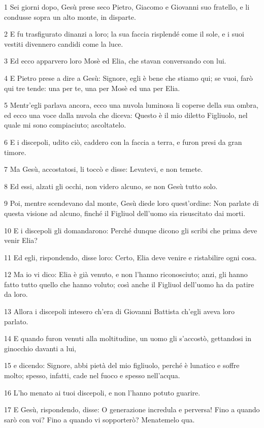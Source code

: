 \par 1 Sei giorni dopo, Gesù prese seco Pietro, Giacomo e Giovanni suo fratello, e li condusse sopra un alto monte, in disparte.
\par 2 E fu trasfigurato dinanzi a loro; la sua faccia risplendé come il sole, e i suoi vestiti divennero candidi come la luce.
\par 3 Ed ecco apparvero loro Mosè ed Elia, che stavan conversando con lui.
\par 4 E Pietro prese a dire a Gesù: Signore, egli è bene che stiamo qui; se vuoi, farò qui tre tende: una per te, una per Mosè ed una per Elia.
\par 5 Mentr'egli parlava ancora, ecco una nuvola luminosa li coperse della sua ombra, ed ecco una voce dalla nuvola che diceva: Questo è il mio diletto Figliuolo, nel quale mi sono compiaciuto; ascoltatelo.
\par 6 E i discepoli, udito ciò, caddero con la faccia a terra, e furon presi da gran timore.
\par 7 Ma Gesù, accostatosi, li toccò e disse: Levatevi, e non temete.
\par 8 Ed essi, alzati gli occhi, non videro alcuno, se non Gesù tutto solo.
\par 9 Poi, mentre scendevano dal monte, Gesù diede loro quest'ordine: Non parlate di questa visione ad alcuno, finché il Figliuol dell'uomo sia risuscitato dai morti.
\par 10 E i discepoli gli domandarono: Perché dunque dicono gli scribi che prima deve venir Elia?
\par 11 Ed egli, rispondendo, disse loro: Certo, Elia deve venire e ristabilire ogni cosa.
\par 12 Ma io vi dico: Elia è già venuto, e non l'hanno riconosciuto; anzi, gli hanno fatto tutto quello che hanno voluto; così anche il Figliuol dell'uomo ha da patire da loro.
\par 13 Allora i discepoli intesero ch'era di Giovanni Battista ch'egli aveva loro parlato.
\par 14 E quando furon venuti alla moltitudine, un uomo gli s'accostò, gettandosi in ginocchio davanti a lui,
\par 15 e dicendo: Signore, abbi pietà del mio figliuolo, perché è lunatico e soffre molto; spesso, infatti, cade nel fuoco e spesso nell'acqua.
\par 16 L'ho menato ai tuoi discepoli, e non l'hanno potuto guarire.
\par 17 E Gesù, rispondendo, disse: O generazione incredula e perversa! Fino a quando sarò con voi? Fino a quando vi sopporterò? Menatemelo qua.
